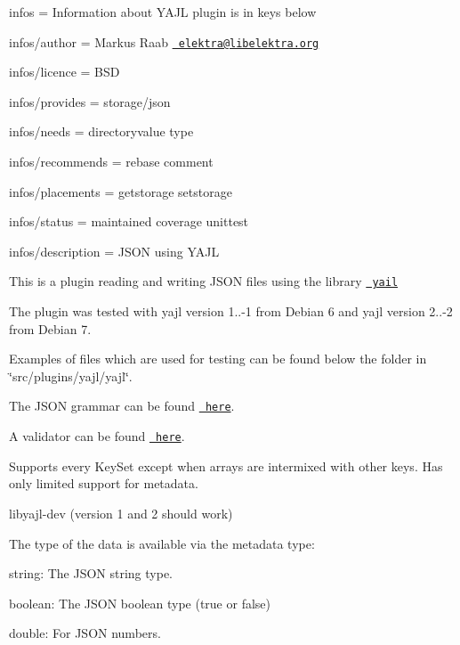 
\begin{DoxyItemize}
\item infos = Information about Y\+A\+JL plugin is in keys below
\item infos/author = Markus Raab \href{mailto:elektra@libelektra.org}{\texttt{ elektra@libelektra.\+org}}
\item infos/licence = B\+SD
\item infos/provides = storage/json
\item infos/needs = directoryvalue type
\item infos/recommends = rebase comment
\item infos/placements = getstorage setstorage
\item infos/status = maintained coverage unittest
\item infos/description = J\+S\+ON using Y\+A\+JL
\end{DoxyItemize}

This is a plugin reading and writing J\+S\+ON files using the library \href{http://lloyd.github.com/yajl/}{\texttt{ yail}}

The plugin was tested with yajl version 1..-\/1 from Debian 6 and yajl version 2..-\/2 from Debian 7.

Examples of files which are used for testing can be found below the folder in \char`\"{}src/plugins/yajl/yajl\char`\"{}.

The J\+S\+ON grammar can be found \href{http://www.json.org}{\texttt{ here}}.

A validator can be found \href{http://jsonlint.com/}{\texttt{ here}}.

Supports every Key\+Set except when arrays are intermixed with other keys. Has only limited support for metadata.


\begin{DoxyItemize}
\item {\ttfamily libyajl-\/dev} (version 1 and 2 should work)
\end{DoxyItemize}

The type of the data is available via the metadata {\ttfamily type}\+:


\begin{DoxyItemize}
\item {\ttfamily string}\+: The J\+S\+ON string type.
\item {\ttfamily boolean}\+: The J\+S\+ON boolean type (true or false)
\item {\ttfamily double}\+: For J\+S\+ON numbers.
\end{DoxyItemize}

